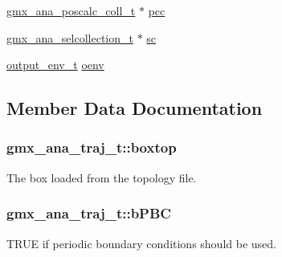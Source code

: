 \begin{DoxyCompactItemize}
\item 
\hyperlink{structgmx__ana__poscalc__coll__t}{gmx\-\_\-ana\-\_\-poscalc\-\_\-coll\-\_\-t} $\ast$ \hyperlink{structgmx__ana__traj__t_acfe937ff43b97461fbc6969dfedcb77b}{pcc}
\item 
\hyperlink{structgmx__ana__selcollection__t}{gmx\-\_\-ana\-\_\-selcollection\-\_\-t} $\ast$ \hyperlink{structgmx__ana__traj__t_a4cf48d41e284b592d6949f7b10f68fad}{sc}
\item 
\hyperlink{include_2types_2oenv_8h_a6a48d77d95132d7318780544821da6a5}{output\-\_\-env\-\_\-t} \hyperlink{structgmx__ana__traj__t_a5c3b4850dc60d9456702a883114cc833}{oenv}
\end{DoxyCompactItemize}


\subsection{\-Member \-Data \-Documentation}
\hypertarget{structgmx__ana__traj__t_a004517c1ffc059544e3b57544b22cd48}{
\subsubsection[{boxtop}]{ {\bf gmx\-\_\-ana\-\_\-traj\-\_\-t\-::boxtop}}}\label{structgmx__ana__traj__t_a004517c1ffc059544e3b57544b22cd48}
\-The box loaded from the topology file. \hypertarget{structgmx__ana__traj__t_a8862da60fa57eee0775c8050546c3975}{
\subsubsection[{b\-P\-B\-C}]{ {\bf gmx\-\_\-ana\-\_\-traj\-\_\-t\-::b\-P\-B\-C}}}\label{structgmx__ana__traj__t_a8862da60fa57eee0775c8050546c3975}


\-T\-R\-U\-E if periodic boundary conditions should be used. 

